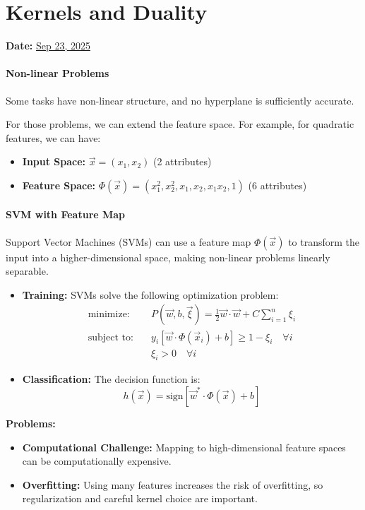 \section{Kernels and Duality}
\textbf{Date:} \underline{Sep 23, 2025}

\paragraph{Non-linear Problems}
Some tasks have non-linear structure, and no hyperplane is sufficiently accurate.

For those problems, we can extend the feature space. For example, for quadratic features, we can have:
\begin{itemize}
    \item \textbf{Input Space:} $\vec{x} = (x_1, x_2)$ \hspace{1cm} (2 attributes)
    \item \textbf{Feature Space:} $\Phi(\vec{x}) = (x_1^2, x_2^2, x_1, x_2, x_1 x_2, 1)$ \hspace{1cm} (6 attributes)
\end{itemize}

\paragraph{SVM with Feature Map}
Support Vector Machines (SVMs) can use a feature map $\Phi(\vec{x})$ to transform the input into a higher-dimensional space, making non-linear problems linearly separable.

\begin{itemize}
    \item \textbf{Training:} SVMs solve the following optimization problem:
    \begin{align*}
        \text{minimize:} \quad & P(\vec{w}, b, \vec{\xi}) = \frac{1}{2} \vec{w} \cdot \vec{w} + C \sum_{i=1}^n \xi_i \\
        \text{subject to:} \quad & y_i [\vec{w} \cdot \Phi(\vec{x}_i) + b] \geq 1 - \xi_i \quad \forall i \\
        & \xi_i > 0 \quad \forall i
    \end{align*}
    \item \textbf{Classification:} The decision function is:
    \[
        h(\vec{x}) = \text{sign} \left[ \vec{w}^* \cdot \Phi(\vec{x}) + b \right]
    \]
\end{itemize}

\textbf{Problems:}
\begin{itemize}
    \item \textbf{Computational Challenge:} Mapping to high-dimensional feature spaces can be computationally expensive.
    \item \textbf{Overfitting:} Using many features increases the risk of overfitting, so regularization and careful kernel choice are important.
\end{itemize}

